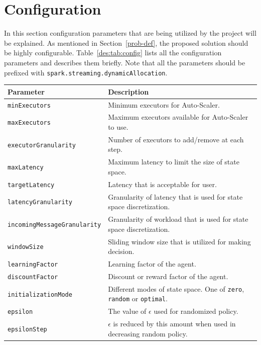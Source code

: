 \section{Configuration}
\label{des:conf}
In this section configuration parameters that are being utilized by the project will be explained. As mentioned in Section~\ref{prob-def}, the proposed solution should be highly configurable. Table~\ref{des:tab:config} lists all the configuration parameters and describes them briefly. Note that all the parameters should be prefixed with \lstinline|spark.streaming.dynamicAllocation|.
\begin{table}[h]
    \begin{tabularx}{\textwidth}{lX}
        \toprule
        \textbf{Parameter} & \textbf{Description}\\
        \midrule
        \lstinline|minExecutors| & Minimum executors for Auto-Scaler.\\
        \lstinline|maxExecutors| & Maximum executors available for Auto-Scaler to use. \\
        \lstinline|executorGranularity| & Number of executors to add/remove at each step. \\
        \lstinline|maxLatency| & Maximum latency to limit the size of state space. \\
        \lstinline|targetLatency| & Latency that is acceptable for user. \\
        \lstinline|latencyGranularity| & Granularity of latency that is used for state space discretization. \\
        \lstinline|incomingMessageGranularity| & Granularity of workload that is used for state space discretization. \\
        \lstinline|windowSize| & Sliding window size that is utilized for making decision. \\
        \lstinline|learningFactor| & Learning factor of the agent. \\
        \lstinline|discountFactor| & Discount or reward factor of the agent. \\
        \lstinline|initializationMode| & Different modes of state space. One of \lstinline|zero|, \lstinline|random| or \lstinline|optimal|. \\
        \lstinline|epsilon| & The value of $\epsilon$ used for randomized policy. \\
        \lstinline|epsilonStep| & $\epsilon$ is reduced by this amount when used in decreasing random policy. \\

\end{tabularx}
\end{table}
